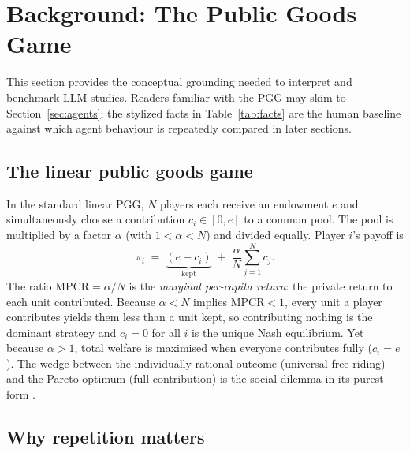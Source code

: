 \documentclass[11pt,a4paper]{article}
\begin{document}
\section{Background: The Public Goods Game}
\label{sec:background}

This section provides the conceptual grounding needed to interpret and benchmark
LLM studies. Readers familiar with the PGG may skim to
Section~\ref{sec:agents}; the stylized facts in Table~\ref{tab:facts} are the
human baseline against which agent behaviour is repeatedly compared in later
sections.

\subsection{The linear public goods game}

In the standard linear PGG, $N$ players each receive an endowment $e$ and
simultaneously choose a contribution $c_i\in[0,e]$ to a common pool. The pool is
multiplied by a factor $\alpha$ (with $1<\alpha<N$) and divided equally. Player
$i$'s payoff is
\begin{equation}
\pi_i \;=\; \underbrace{(e-c_i)}_{\text{kept}} \;+\;
\frac{\alpha}{N}\sum_{j=1}^{N} c_j .
\label{eq:pgg}
\end{equation}
The ratio $\mathrm{MPCR}=\alpha/N$ is the \emph{marginal per-capita return}: the
private return to each unit contributed. Because $\alpha<N$ implies
$\mathrm{MPCR}<1$, every unit a player contributes yields them less than a unit
kept, so contributing nothing is the dominant strategy and $c_i=0$ for all $i$ is
the unique Nash equilibrium. Yet because $\alpha>1$, total welfare is maximised
when everyone contributes fully ($c_i=e$). The wedge between the individually
rational outcome (universal free-riding) and the Pareto optimum (full
contribution) is the social dilemma in its purest form
\citep{ledyard1995public,camerer2003behavioral}.

\subsection{Why repetition matters}
\end{document}
